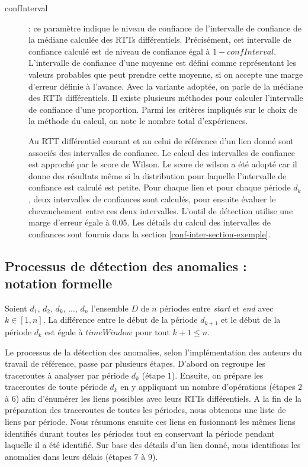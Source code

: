 \begin{description}
	
	\item[confInterval] : ce paramètre indique le niveau de confiance de l'intervalle de confiance de la médiane calculée des RTTs différentiels. Précisément, cet intervalle de confiance calculé est de niveau de confiance égal à $ 1 - confInterval $.  L'intervalle de confiance d'une moyenne  est défini comme représentant les valeurs probables que peut prendre cette moyenne, si on accepte une marge d'erreur définie à l'avance. Avec la variante adoptée, on parle de la médiane des RTTs différentiels. Il existe plusieurs méthodes pour calculer l'intervalle de confiance d'une proportion. Parmi les critères impliqués sur le choix de la méthode du calcul, on note le nombre total d'expériences.
	
	Au RTT différentiel courant et  au celui de référence d'un lien donné sont associés des intervalles de confiance.  Le calcul des intervalles de confiance  est approché par le score de Wilson. Le score de wilson a été adopté car il donne des résultats même si la distribution pour laquelle l'intervalle de confiance est calculé est petite. Pour chaque lien et pour chaque période $d_k$,  deux intervalles de confiances sont calculés, pour ensuite évaluer le chevauchement entre ces deux intervalles. L'outil de détection utilise une marge d'erreur égale à  $ 0.05 $. Les détails du calcul des intervalles de confiances sont fournis dans la section \ref{conf-inter-section-exemple}.
\end{description}


\subsection{Processus de  détection des anomalies  : notation formelle}\label{steps-rtt-analysis}

Soient $ d_1 $, $  d_2 $, $d_k$, ..., $ d_n $ l'ensemble $D$ de $n$ périodes entre \textit{start} et \textit{end} avec $k \in [1,n]$. La différence entre le début de la période $ d_{k+1} $ et le début de la période $ d_k $ est égale à $timeWindow$ pour tout $k+1 \leq n $.  

Le processus de la détection des anomalies, selon l'implémentation \cite{InternetHealthReport} des auteurs du travail de référence,  passe par plusieurs étapes. D'abord on  regroupe les traceroutes à analyser par période $d_k$ (étape $ 1 $). Ensuite, on prépare les traceroutes de toute  période $d_k$ en y appliquant un nombre d'opérations (étapes  $ 2 $ à $ 6 $) afin d'énumérer les liens possibles avec leurs RTTs différentiels. A la fin de la préparation des traceroutes de toutes les périodes, nous obtenons une liste de liens par période. Nous résumons ensuite ces liens en fusionnant les mêmes liens identifiés durant toutes les périodes tout en conservant la période pendant laquelle il a été identifié. Sur base des détails d'un lien donné,  nous identifions les anomalies dans leurs délais (étapes $ 7 $ à $9$). 

